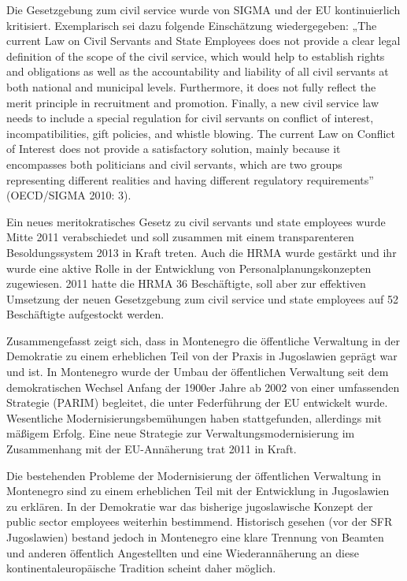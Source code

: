 Die Gesetzgebung zum civil service wurde von SIGMA und der EU kontinuierlich kritisiert. Exemplarisch sei dazu folgende Einschätzung wiedergegeben: „The current Law on Civil Servants and State Employees does not provide a clear legal definition of the scope of the civil service, which would help to establish rights and obligations as well as the accountability and liability of all civil servants at both national and municipal levels. Furthermore, it does not fully reflect the merit principle in recruitment and promotion. Finally, a new civil service law needs to include a special regulation for civil servants on conflict of interest, incompatibilities, gift policies, and whistle blowing. The current Law on Conflict of Interest does not provide a satisfactory solution, mainly because it encompasses both politicians and civil servants, which are two groups representing different realities and having different regulatory requirements” (OECD/SIGMA 2010: 3).\par
Ein neues meritokratisches Gesetz zu civil servants und state employees wurde Mitte 2011 verabschiedet und soll zusammen mit einem transparenteren Besoldungssystem 2013 in Kraft treten. Auch die HRMA wurde gestärkt und ihr wurde eine aktive Rolle in der Entwicklung von Personalplanungskonzepten zugewiesen. 2011 hatte die HRMA 36 Beschäftigte, soll aber zur effektiven Umsetzung der neuen Gesetzgebung zum civil service und state employees auf 52 Beschäftigte aufgestockt werden.\par
Zusammengefasst zeigt sich, dass in Montenegro die öffentliche Verwaltung in der Demokratie zu einem erheblichen Teil von der Praxis in Jugoslawien geprägt war und ist. In Montenegro wurde der Umbau der öffentlichen Verwaltung seit dem demokratischen Wechsel Anfang der 1900er Jahre ab 2002 von einer umfassenden Strategie (PARIM) begleitet, die unter Federführung der EU entwickelt wurde. Wesentliche Modernisierungsbemühungen haben stattgefunden, allerdings mit mäßigem Erfolg. Eine neue Strategie zur Verwaltungsmodernisierung im Zusammenhang mit der EU-Annäherung trat 2011 in Kraft. \par
Die bestehenden Probleme der Modernisierung der öffentlichen Verwaltung in Montenegro sind zu einem erheblichen Teil mit der Entwicklung in Jugoslawien zu erklären. In der Demokratie war das bisherige jugoslawische Konzept der public sector employees weiterhin bestimmend. Historisch gesehen (vor der SFR Jugoslawien) bestand jedoch in Montenegro eine klare Trennung von Beamten und anderen öffentlich Angestellten und eine Wiederannäherung an diese kontinentaleuropäische Tradition scheint daher möglich. \par
